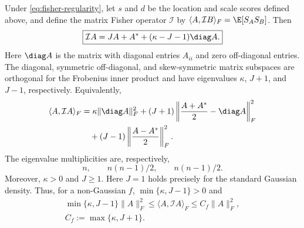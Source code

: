 \begin{theorem}
\label{thm:fisher-spectrum}
Under \eqref{eq:fisher-regularity}, let \(s\) and \(d\) be the location and
scale scores defined above, and define the matrix Fisher operator
$\mathcal I$ by
$\langle A,\mathcal I B\rangle_F=\E[S_AS_B]$.
Then
\begin{equation}
 \boxed{\mathcal I A=JA+A^*
                     +(\kappa-J-1)\diag A.}
 \label{eq:fisher-operator-spectrum}
\end{equation}
Here $\diag A$ is the matrix with diagonal entries $A_{ii}$ and zero
off-diagonal entries.  The diagonal, symmetric off-diagonal, and skew-symmetric matrix subspaces
are orthogonal for the Frobenius inner product and have eigenvalues
$\kappa$, $J+1$, and $J-1$, respectively.  Equivalently,
\begin{equation}
 \begin{aligned}
 \langle A,\mathcal I A\rangle_F
 &=\kappa\|\diag A\|_F^2
   +(J+1)\left\|\frac{A+A^*}2-\diag A\right\|_F^2\\
 &\quad +(J-1)\left\|\frac{A-A^*}2\right\|_F^2.
 \end{aligned}
 \label{eq:fisher-decomposition}
\end{equation}
The eigenvalue multiplicities are, respectively,
\begin{equation}
 n,\qquad n(n-1)/2,\qquad n(n-1)/2.
 \label{eq:fisher-multiplicities}
\end{equation}
Moreover, $\kappa>0$ and $J\ge1$.
Here $J=1$ holds precisely for the
standard Gaussian density.  Thus, for a non-Gaussian $f$,
$\min\{\kappa,J-1\}>0$ and
\begin{equation}
 \begin{gathered}
 \min\{\kappa,J-1\}\|A\|_F^2\le\langle A,\mathcal I A\rangle_F
 \le C_f\|A\|_F^2,\\
 C_f:=\max\{\kappa,J+1\}.
 \end{gathered}
 \label{eq:fisher-ellipticity}
\end{equation}
\end{theorem}

